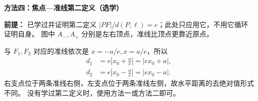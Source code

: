 \clearpage
\begin{proofbox}
\textbf{\textcolor{CProof}{方法四：焦点—准线第二定义（选学）}}

\textbf{前提：} 已学过并证明第二定义 $|PF|/d(P,\ell)=e$；此处只应用它，不用它循环证明自身。
图中 $A_-,A_+$ 分别是左右顶点，准线比顶点更靠近原点。

与 $F_1,F_2$ 对应的准线依次是 $x=-a/e,x=a/e$，所以
\[
\begin{aligned}
d_1&=e\left|x_0+\frac ae\right|=|ex_0+a|,\\
d_2&=e\left|x_0-\frac ae\right|=|ex_0-a|.
\end{aligned}
\]
右支点位于两条准线右侧，左支点位于两条准线左侧，故水平距离的去绝对值形式不同。
没有学过第二定义时，使用方法一或方法二即可。
\end{proofbox}
